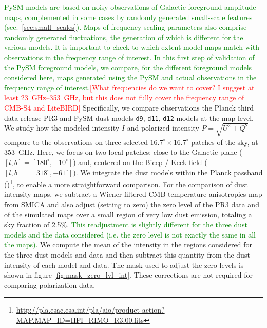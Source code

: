 \documentclass[twocolumn]{aastex631}
\newcommand{\dnine}{{\tt d9}}
\newcommand{\jd}[1]{\textcolor{green}{#1}}
\begin{document}
\jd{PySM models are based on noisy observations of Galactic foreground amplitude maps, complemented in some cases by randomly generated small-scale features (sec.~\ref{sec:small_scales}). Maps of frequency scaling parameters also comprise randomly generated fluctuations, the generation of which is different for the various models. It is important to check to which extent model maps match with observations in the frequency range of interest. In this first step of validation of the PySM foreground models, we compare, for the different foreground models considered here, maps generated using the PySM and actual observations in the frequency range of interest.}\textcolor{red}{[What frequencies do we want to cover? I suggest at least 23~GHz--353~GHz, but this does not fully cover the frequency range of CMB-S4 and LiteBIRD]}
Specifically, we compare observations the Planck third data release PR3 \cite{planck2016-l03} and PySM dust models \dnine{}, {\tt d11}, {\tt d12} models at the map level. We study how the modeled intensity $I$ and polarized intensity $P = \sqrt{U^2 + Q^2}$ compare to the observations on three selected $16.7^\circ \times 16.7^\circ$ patches of the sky, at 353~GHz. Here, we focus on two local patches: close to the Galactic plane ($[l,b] =[180^\circ,-10^\circ]$) and, centered on the Bicep / Keck field ($[l,b] =[318^\circ,-61^\circ]$).
We integrate the dust models within the Planck passband (\cite{planck2013-p03d})\footnote{\url{http://pla.esac.esa.int/pla/aio/product-action?MAP.MAP_ID=HFI_RIMO_R3.00.fits}}, to enable a more straightforward comparison. For the comparison of dust intensity maps, we subtract a Wiener-filtered CMB temperature anisotropies map from SMICA and also adjust (setting to zero) the zero level of the PR3 data and of the simulated maps over a small region of very low dust emission, totaling a sky fraction of 2.5\%.
\jd{This readjustment is slightly different for the three dust models and the data considered (i.e. the zero level is not exactly the same in all the maps).} We compute the mean of the intensity in the regions considered for the three dust models and data and then subtract this quantity from the dust intensity of each model and data. The mask used to adjust the zero levels is shown in figure \ref{fig:mask_zero_lvl_int}. 
These corrections are not required for comparing polarization data. 
\end{document}
